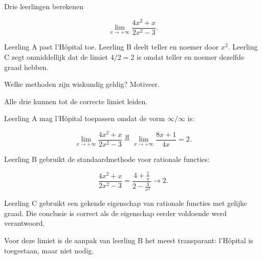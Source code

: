 \documentclass{ximera}
\begin{document}
\begin{oefening}{\oefU\ESS}

Drie leerlingen berekenen

\[\lim_{x\to+\infty}\frac{4x^2+x}{2x^2-3}.\]

Leerling A past l'Hôpital toe. Leerling B deelt teller en noemer door
\(x^2\). Leerling C zegt onmiddellijk dat de limiet \(4/2=2\) is omdat
teller en noemer dezelfde graad hebben.

\begin{question}
Welke methoden zijn wiskundig geldig? Motiveer.

\begin{oplossing}
Alle drie kunnen tot de correcte limiet leiden.

Leerling A mag l'Hôpital toepassen omdat de vorm
\(\infty/\infty\) is:

\[
\lim_{x\to+\infty}\frac{4x^2+x}{2x^2-3}
\overset{\mathrm H}{=}
\lim_{x\to+\infty}\frac{8x+1}{4x}
=2.
\]

Leerling B gebruikt de standaardmethode voor rationale functies:

\[
\frac{4x^2+x}{2x^2-3}
=
\frac{4+\frac1x}{2-\frac3{x^2}}
\longrightarrow2.
\]

Leerling C gebruikt een gekende eigenschap van rationale functies met
gelijke graad. Die conclusie is correct als de eigenschap eerder
voldoende werd verantwoord.

Voor deze limiet is de aanpak van leerling B het meest transparant:
l'Hôpital is toegestaan, maar niet nodig.
\end{oplossing}
\end{question}
\end{oefening}
\end{document}
